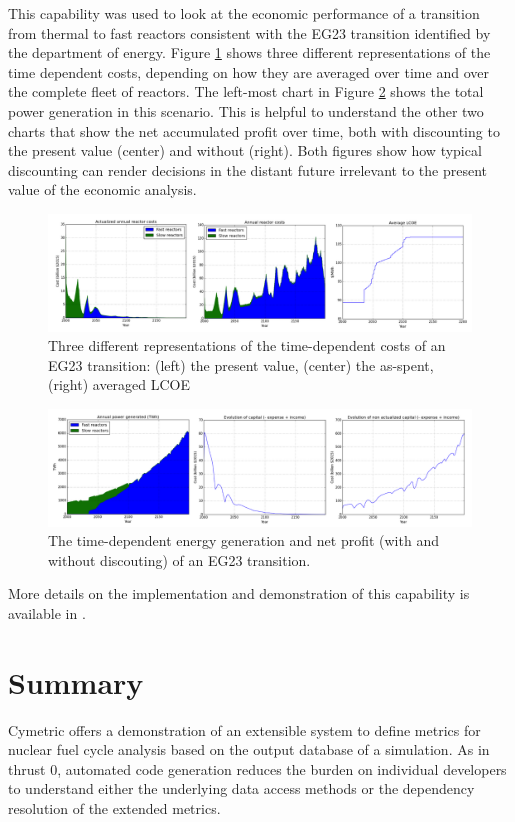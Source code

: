 This capability was used to look at the economic performance of a transition
from thermal to fast reactors consistent with the EG23 transition identified
by the department of energy.  Figure \ref{fig:econ-eg23-1} shows three
different representations of the time dependent costs, depending on how they
are averaged over time and over the complete fleet of reactors.  The left-most
chart in Figure \ref{fig:econ-eg23-2} shows the total power generation in this
scenario.  This is helpful to understand the other two charts that show the
net accumulated profit over time, both with discounting to the present value
(center) and without (right).  Both figures show how typical discounting can
render decisions in the distant future irrelevant to the present value of the
economic analysis.

\begin{figure}[htbp]
\begin{center}
\includegraphics[width=\columnwidth]{./images/econ-eg23-1}
\caption{Three different representations of the time-dependent costs of an
  EG23 transition: (left) the present value, (center) the as-spent, (right)
  averaged \gls{LCOE}}
\end{center}
\label{fig:econ-eg23-1}
\end{figure}

\begin{figure}[htbp]
\begin{center}
\includegraphics[width=\columnwidth]{./images/econ-eg23-2}
\caption{The time-dependent energy generation and net profit (with and without
  discouting) of an EG23 transition.}
\end{center}
\label{fig:econ-eg23-2}
\end{figure}


More details on the implementation and demonstration of this capability is
available in .  

\section{Summary}

Cymetric offers a demonstration of an extensible system to define metrics for
nuclear fuel cycle analysis based on the output database of a \Cyclus
simulation.  As in thrust 0, automated code generation reduces the burden on
individual developers to understand either the underlying data access methods
or the dependency resolution of the extended metrics.
